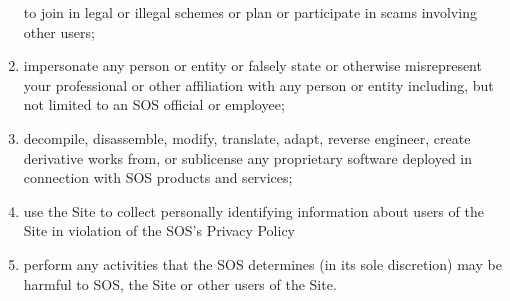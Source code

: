 \begin{enumerate}[label=]
    to join in legal or illegal schemes or plan or participate in scams
    involving other users;
    \item impersonate any person or entity or falsely state or otherwise
    misrepresent your professional or other affiliation with any person or
    entity including, but not limited to an SOS official or employee;
    \item decompile, disassemble, modify, translate, adapt, reverse engineer,
    create derivative works from, or sublicense any proprietary software
    deployed in connection with SOS products and services;
    \item use the Site to collect personally identifying information about users
    of the Site in violation of the SOS's Privacy Policy
    \item perform any activities that the SOS determines (in its sole
    discretion) may be harmful to SOS, the Site or other users of the Site.
\end{enumerate}